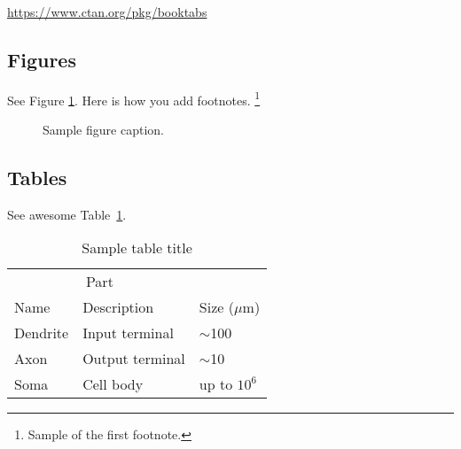 \documentclass{article}
\theoremstyle{plain}%
\theoremstyle{definition}
\theoremstyle{remark}
\begin{document}
\begin{center}
  \url{https://www.ctan.org/pkg/booktabs}
\end{center}


\subsection{Figures}
See Figure \ref{fig:fig1}. Here is how you add footnotes. \footnote{Sample of the first footnote.}

\begin{figure}
  \centering
  \fbox{\rule[-.5cm]{4cm}{4cm} \rule[-.5cm]{4cm}{0cm}}
  \caption{Sample figure caption.}
  \label{fig:fig1}
\end{figure}

\subsection{Tables}
See awesome Table~\ref{tab:table}.

\begin{table}
 \caption{Sample table title}
  \centering
  \begin{tabular}{lll}
    \toprule
    \multicolumn{2}{c}{Part}                   \\
    \cmidrule(r){1-2}
    Name     & Description     & Size ($\mu$m) \\
    \midrule
    Dendrite & Input terminal  & $\sim$100     \\
    Axon     & Output terminal & $\sim$10      \\
    Soma     & Cell body       & up to $10^6$  \\
    \bottomrule
  \end{tabular}
  \label{tab:table}
\end{table}







% 
% 
% 
% 
% 
% 
% 
\end{document}
